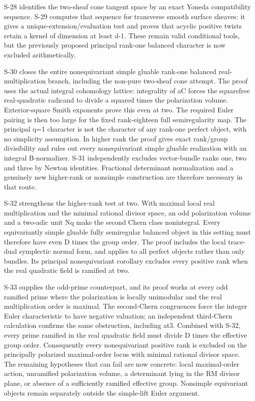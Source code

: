 \documentclass[11pt,a4paper]{article}
\theoremstyle{definition}
\begin{document}
S-28 identifies the two-sheaf cone tangent space by an exact Yoneda
compatibility sequence. S-29 computes that sequence for transverse
smooth surface sheaves: it gives a unique-extension/evaluation test and
proves that acyclic positive twists retain a kernel of dimension at
least d-1. These remain valid conditional tools, but the previously
proposed principal rank-one balanced character is now excluded
arithmetically.

S-30 closes the entire nonequivariant simple gluable rank-one balanced
real-multiplication branch, including the non-pure two-sheaf cone
attempt. The proof uses the actual integral cohomology lattice:
integrality of aC forces the squarefree real-quadratic radicand to
divide a squared times the polarization volume. Exterior-square Smith
exponents prove this even at two. The required Euler pairing is then too
large for the fixed rank-eighteen full semiregularity map. The principal
q=1 character is not the character of any rank-one perfect object, with
no simplicity assumption. In higher rank the proof gives exact
rank/group divisibility and rules out every nonequivariant simple
gluable realization with an integral B-normalizer. S-31 independently
excludes vector-bundle ranks one, two and three by Newton identities.
Fractional determinant normalization and a genuinely new higher-rank or
nonsimple construction are therefore necessary in that route.

S-32 strengthens the higher-rank test at two. With maximal local real
multiplication and the minimal rational divisor space, an odd
polarization volume and a two-adic unit Nq make the second Chern class
nonintegral. Every equivariantly simple gluable fully semiregular
balanced object in this setting must therefore have even D times the
group order. The proof includes the local trace-dual symplectic normal
form, and applies to all perfect objects rather than only bundles. Its
principal nonequivariant corollary excludes every positive rank when the
real quadratic field is ramified at two.

S-33 supplies the odd-prime counterpart, and its proof works at every
odd ramified prime where the polarization is locally unimodular and the
real multiplication order is maximal. The second-Chern congruences force
the integer Euler characteristic to have negative valuation; an
independent third-Chern calculation confirms the same obstruction,
including at3. Combined with S-32, every prime ramified in the real
quadratic field must divide D times the effective group order.
Consequently every nonequivariant positive rank is excluded on the
principally polarized maximal-order locus with minimal rational divisor
space. The remaining hypotheses that can fail are now concrete: local
maximal-order action, unramified polarization volume, a determinant
lying in the RM divisor plane, or absence of a sufficiently ramified
effective group. Nonsimple equivariant objects remain separately outside
the simple-lift Euler argument.
\end{document}
